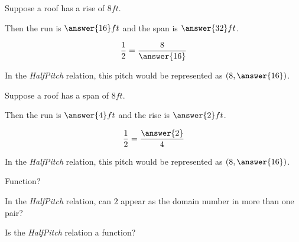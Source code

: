 \documentclass{ximera}
\begin{document}
\begin{question}

Suppose a roof has a rise of $8 ft$.  

Then the run is $\answer{16} ft$ and the span is $\answer{32} ft$.

\[
\frac{1}{2} = \frac{8}{\answer{16}}
\]


In the \textit{HalfPitch} relation, this pitch would be represented as $\left( 8, \answer{16} \right)$.

\end{question}








\begin{question}

Suppose a roof has a span of $8 ft$.  

Then the run is $\answer{4} ft$ and the rise is $\answer{2} ft$.

\[
\frac{1}{2} = \frac{\answer{2}}{4}
\]


In the \textit{HalfPitch} relation, this pitch would be represented as $\left( 8, \answer{16} \right)$.

\end{question}







\begin{exercise}  Function?

In the \textit{HalfPitch} relation, can $2$ appear as the domain number in more than one pair?
\begin{multipleChoice}
\end{multipleChoice}





Is the \textit{HalfPitch} relation a function?
\begin{multipleChoice}
\end{multipleChoice}

\end{exercise}
\end{document}
